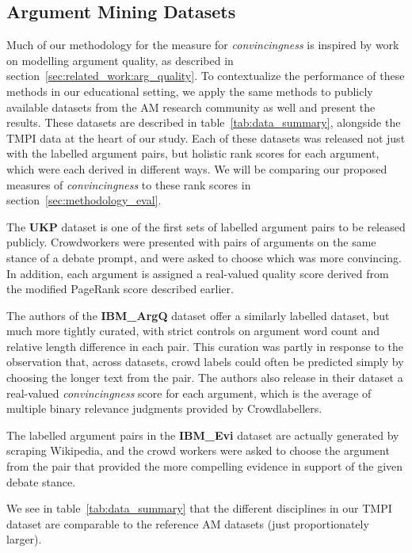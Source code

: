 \documentclass[notitlepage,12pt]{jedm}
\begin{document}
\subsection{Argument Mining Datasets}\label{sec:dataset-AM}
Much of our methodology for the measure for \textit{convincingness} is inspired by work on modelling argument quality, as described in section~\ref{sec:related_work:arg_quality}. 
To contextualize the performance of these methods in our educational 
setting, we apply the same methods to publicly available datasets from the 
AM research community as well and present the results. 
These datasets are described in table~\ref{tab:data_summary}, alongside the 
TMPI data at the heart of our study. 
Each of these datasets was released not just with the labelled argument pairs, 
but holistic rank scores for each argument, which were each derived in different 
ways. 
We will be comparing our proposed measures of \textit{convincingness} to these 
rank scores in section~\ref{sec:methodology_eval}.

The \textbf{UKP} dataset \cite{habernal_which_2016} is one of the first sets of 
labelled argument pairs to be released publicly.
Crowdworkers were presented with pairs of arguments on the same stance of a 
debate prompt, and were asked to choose which was more convincing.
In addition, each argument is assigned a real-valued quality score derived 
from the modified PageRank score described earlier.

The authors of the \textbf{IBM\_ArgQ} dataset \cite{toledo_automatic_2019} 
offer a similarly labelled dataset, but much more tightly curated, with 
strict controls on argument word count and relative length difference in 
each pair.
This curation was partly in response to the observation that, across datasets, crowd 
labels could often be predicted simply by choosing the longer text from the 
pair.
The authors also release in their dataset a real-valued \textit{convincingness} 
score for each argument, which is the average of multiple binary relevance 
judgments provided by Crowdlabellers. 

The labelled argument pairs in the \textbf{IBM\_Evi} dataset 
\cite{gleize_are_2019} are actually generated by scraping Wikipedia, and the 
crowd workers were asked to choose the argument from the pair that provided the 
more compelling evidence in support of the given debate stance.

We see in table~\ref{tab:data_summary} that the different disciplines in our 
TMPI dataset are comparable to the reference AM datasets (just proportionately 
larger).
\end{document}
